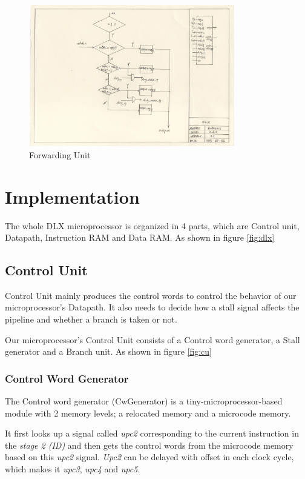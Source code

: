\begin{figure}[Ht]
    \centering
    \includegraphics[width=0.8\textwidth]{fig/fwd.jpg}
    \caption{Forwarding Unit}
    \label{fig:fwd}
\end{figure}

\chapter[Implementation]{Implementation}
The whole DLX microprocessor is organized in 4 parts, which are Control unit, Datapath,
Instruction RAM and Data RAM. As shown in figure \ref{fig:dlx}

\section[Control Unit]{Control Unit}
Control Unit mainly produces the control words to control the behavior of our microprocessor's Datapath.
It also needs to decide how a stall signal affects the pipeline and whether a branch
is taken or not.

Our microprocessor's Control Unit consists of a Control word generator, a Stall generator and a Branch unit.
As shown in figure \ref{fig:cu}

\subsection[Control Word Generator]{Control Word Generator}
The Control word generator (CwGenerator) is a tiny-microprocessor-based module with 2 memory levels;
a relocated memory and a microcode memory.

It first looks up a signal called {\it upc2} corresponding to the current instruction in the {\it stage 2 (ID)} and then gets the control
words from the microcode memory based on this {\it upc2} signal. {\it Upc2} can be delayed with offset in each clock cycle,
which makes it {\it upc3}, {\it upc4} and {\it upc5}.

